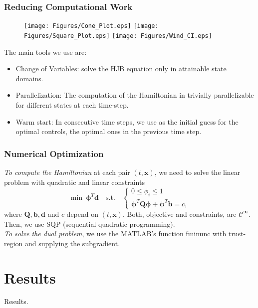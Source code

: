 
\begin{frame}
\frametitle{Reducing Computational Work}

\begin{figure}[ht!]
\centering
\subfloat
{\texttt{[image: Figures/Cone\_Plot.eps]}}\quad
{\texttt{[image: Figures/Square\_Plot.eps]}}\quad
{\texttt{[image: Figures/Wind\_CI.eps]}}
\end{figure}
{\footnotesize The main tools we use are:
\begin{itemize}
\item \alert{Change of Variables}: solve the HJB equation only in attainable state domains.
\item \alert{Parallelization}: The computation of the Hamiltonian in trivially parallelizable for different states at each time-step.
\item \alert{Warm start}: In consecutive time steps, we use as the initial guess for the optimal controls, the optimal ones in the previous time step.
\end{itemize}}

\end{frame}


\begin{frame}
\frametitle{Numerical Optimization}
\textit{To compute the Hamiltonian} at each pair $(t,\bm{x})$, we need to solve the linear problem with quadratic and linear constraints
\begin{equation*}
\min\ \bm{\phi}^T\bm{d}\quad\text{s.t.}\quad\begin{cases}
0\leq\phi_i\leq1\\
\bm{\phi}^T\bm{Q}\bm{\phi}+\bm{\phi}^T\bm{b}=c,
\end{cases}
\end{equation*}
where $\bm{Q,b,d}$ and $c$ depend on $(t,\bm{x})$. Both, objective and constraints, are $\mathcal{C}^{\infty}$. Then, we use SQP (sequential quadratic programming).\\
\textit{To solve the dual problem}, we use the MATLAB's function fminunc with trust-region and supplying the subgradient.
\end{frame}


\section{Results}
{ 
\begin{frame}[noframenumbering]
\centering
{\Huge Results.}
\end{frame}}

